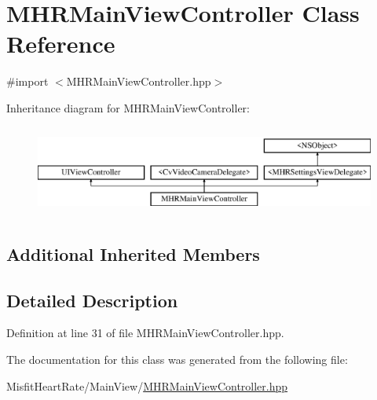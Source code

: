 \hypertarget{interface_m_h_r_main_view_controller}{\section{M\+H\+R\+Main\+View\+Controller Class Reference}
\label{interface_m_h_r_main_view_controller}
}


{\ttfamily \#import $<$M\+H\+R\+Main\+View\+Controller.\+hpp$>$}

Inheritance diagram for M\+H\+R\+Main\+View\+Controller\+:\begin{figure}[H]
\begin{center}
\leavevmode
\includegraphics[height=3.000000cm]{interface_m_h_r_main_view_controller}
\end{center}
\end{figure}
\subsection*{Additional Inherited Members}


\subsection{Detailed Description}


Definition at line 31 of file M\+H\+R\+Main\+View\+Controller.\+hpp.



The documentation for this class was generated from the following file\+:\begin{DoxyCompactItemize}
\item 
Misfit\+Heart\+Rate/\+Main\+View/\hyperlink{_m_h_r_main_view_controller_8hpp}{M\+H\+R\+Main\+View\+Controller.\+hpp}\end{DoxyCompactItemize}
